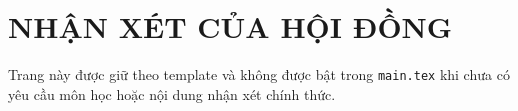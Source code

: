 \chapter*{NHẬN XÉT CỦA HỘI ĐỒNG}

Trang này được giữ theo template và không được bật trong \texttt{main.tex} khi
chưa có yêu cầu môn học hoặc nội dung nhận xét chính thức.
